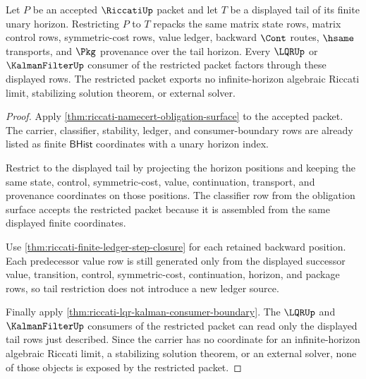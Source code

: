 \begin{theorem}
\label{thm:riccati-finite-horizon-tail-restriction}
Let $P$ be an accepted $\RiccatiUp$ packet and let $T$ be a displayed tail of
its finite unary horizon. Restricting $P$ to $T$ repacks the same matrix state
rows, matrix control rows, symmetric-cost rows, value ledger, backward $\Cont$
routes, $\hsame$ transports, and $\Pkg$ provenance over the tail horizon.
Every $\LQRUp$ or $\KalmanFilterUp$ consumer of the restricted packet factors
through these displayed rows. The restricted packet exports no
infinite-horizon algebraic Riccati limit, stabilizing solution theorem, or
external solver.
\end{theorem}
\begin{proof}
Apply \autoref{thm:riccati-namecert-obligation-surface} to the accepted packet.
The carrier, classifier, stability, ledger, and consumer-boundary rows are
already listed as finite $\mathsf{BHist}$ coordinates with a unary horizon
index.

Restrict to the displayed tail by projecting the horizon positions and keeping
the same state, control, symmetric-cost, value, continuation, transport, and
provenance coordinates on those positions. The classifier row from the
obligation surface accepts the restricted packet because it is assembled from
the same displayed finite coordinates.

Use \autoref{thm:riccati-finite-ledger-step-closure} for each retained backward
position. Each predecessor value row is still generated only from the displayed
successor value, transition, control, symmetric-cost, continuation, horizon, and
package rows, so tail restriction does not introduce a new ledger source.

Finally apply \autoref{thm:riccati-lqr-kalman-consumer-boundary}. The
$\LQRUp$ and $\KalmanFilterUp$ consumers of the restricted packet can read only
the displayed tail rows just described. Since the carrier has no coordinate for
an infinite-horizon algebraic Riccati limit, a stabilizing solution theorem, or
an external solver, none of those objects is exposed by the restricted packet.
\end{proof}

